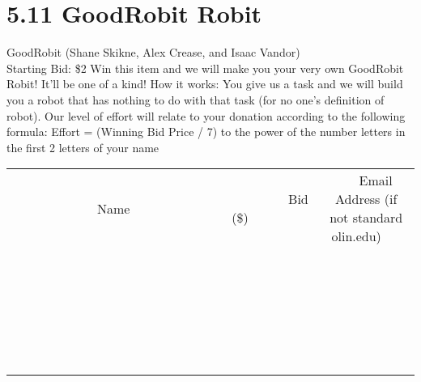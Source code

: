 \documentclass[11pt]{article}
\begin{document}
\section*{5.11 GoodRobit Robit}
GoodRobit (Shane Skikne, Alex Crease, and Isaac Vandor)
\\
Starting Bid: \$2
\newline
Win this item and we will make you your very own GoodRobit Robit! It'll be one of a kind! 
How it works: You give us a task and we will build you a robot that has nothing to do with that task (for no one's  definition of robot). 
Our level of effort will relate to your donation according to the following formula: Effort = (Winning Bid Price / 7) to the power of the number letters in the first 2 letters of your name
\\[6ex]
\begin{tabular}{c c c}
~~~~~~~~~~~~~Name~~~~~~~~~~~~~ & ~~~~~~~~~Bid (\$)~~~~~~~~~  & ~~~Email Address (if not standard olin.edu)~~~\\
 & & \\
\hline
 & & \\
\hline
 & & \\
\hline
 & & \\
\hline
 & & \\
\hline
 & & \\
\hline
 & & \\
\hline
 & & \\
\hline
 & & \\
\hline
 & & \\
\hline
 & & \\
\hline
 & & \\
\hline
 & & \\
\hline
 & & \\
\hline
 & & \\
\hline
 & & \\
\hline
 & & \\
\hline
 & & \\
\hline
 & & \\
\hline
 & & \\
\hline
 & & \\
\hline
 & & \\
\hline
 & & \\
\hline
 & & \\
\hline
 & & \\
\hline
 & & \\
\hline
\end{tabular}
\newpage
\end{document}
